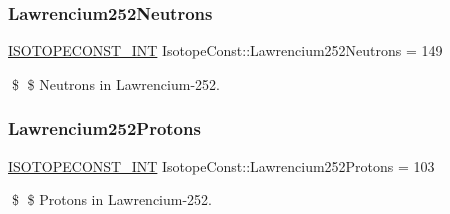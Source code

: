 \subsubsection{\texorpdfstring{Lawrencium252\+Neutrons}{Lawrencium252Neutrons}}
{\footnotesize\ttfamily \mbox{\hyperlink{group___isotope_const-_macros_ga5f18360b3e99483a35c32d789e62621c}{I\+S\+O\+T\+O\+P\+E\+C\+O\+N\+S\+T\+\_\+\+I\+NT}} Isotope\+Const\+::\+Lawrencium252\+Neutrons = 149}

\$ \$ Neutrons in Lawrencium-\/252. \mbox{\label{group___isotope_const-_lawrencium-_lr252_gaba8a458df9f67624544ec184c02cb1e2}} 
\subsubsection{\texorpdfstring{Lawrencium252\+Protons}{Lawrencium252Protons}}
{\footnotesize\ttfamily \mbox{\hyperlink{group___isotope_const-_macros_ga5f18360b3e99483a35c32d789e62621c}{I\+S\+O\+T\+O\+P\+E\+C\+O\+N\+S\+T\+\_\+\+I\+NT}} Isotope\+Const\+::\+Lawrencium252\+Protons = 103}

\$ \$ Protons in Lawrencium-\/252. 